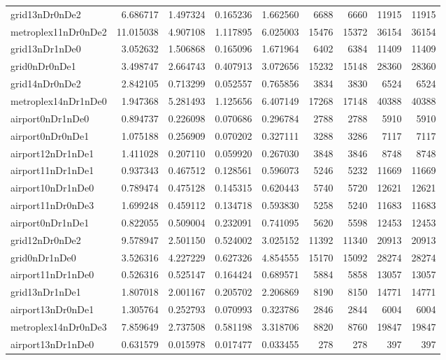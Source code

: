 \begin{longtable}{|l|r|r|r|r|r|r|r|r|}
grid13nDr0nDe2 & 6.686717 & 1.497324 & 0.165236 & 1.662560 & 6688 & 6660 & 11915 & 11915 \\
metroplex11nDr0nDe2 & 11.015038 & 4.907108 & 1.117895 & 6.025003 & 15476 & 15372 & 36154 & 36154 \\
grid13nDr1nDe0 & 3.052632 & 1.506868 & 0.165096 & 1.671964 & 6402 & 6384 & 11409 & 11409 \\
grid0nDr0nDe1 & 3.498747 & 2.664743 & 0.407913 & 3.072656 & 15232 & 15148 & 28360 & 28360 \\
grid14nDr0nDe2 & 2.842105 & 0.713299 & 0.052557 & 0.765856 & 3834 & 3830 & 6524 & 6524 \\
metroplex14nDr1nDe0 & 1.947368 & 5.281493 & 1.125656 & 6.407149 & 17268 & 17148 & 40388 & 40388 \\
airport0nDr1nDe0 & 0.894737 & 0.226098 & 0.070686 & 0.296784 & 2788 & 2788 & 5910 & 5910 \\
airport0nDr0nDe1 & 1.075188 & 0.256909 & 0.070202 & 0.327111 & 3288 & 3286 & 7117 & 7117 \\
airport12nDr1nDe1 & 1.411028 & 0.207110 & 0.059920 & 0.267030 & 3848 & 3846 & 8748 & 8748 \\
airport11nDr1nDe1 & 0.937343 & 0.467512 & 0.128561 & 0.596073 & 5246 & 5232 & 11669 & 11669 \\
airport10nDr1nDe0 & 0.789474 & 0.475128 & 0.145315 & 0.620443 & 5740 & 5720 & 12621 & 12621 \\
airport11nDr0nDe3 & 1.699248 & 0.459112 & 0.134718 & 0.593830 & 5258 & 5240 & 11683 & 11683 \\
airport0nDr1nDe1 & 0.822055 & 0.509004 & 0.232091 & 0.741095 & 5620 & 5598 & 12453 & 12453 \\
grid12nDr0nDe2 & 9.578947 & 2.501150 & 0.524002 & 3.025152 & 11392 & 11340 & 20913 & 20913 \\
grid0nDr1nDe0 & 3.526316 & 4.227229 & 0.627326 & 4.854555 & 15170 & 15092 & 28274 & 28274 \\
airport11nDr1nDe0 & 0.526316 & 0.525147 & 0.164424 & 0.689571 & 5884 & 5858 & 13057 & 13057 \\
grid13nDr1nDe1 & 1.807018 & 2.001167 & 0.205702 & 2.206869 & 8190 & 8150 & 14771 & 14771 \\
airport13nDr0nDe1 & 1.305764 & 0.252793 & 0.070993 & 0.323786 & 2846 & 2844 & 6004 & 6004 \\
metroplex14nDr0nDe3 & 7.859649 & 2.737508 & 0.581198 & 3.318706 & 8820 & 8760 & 19847 & 19847 \\
airport13nDr1nDe0 & 0.631579 & 0.015978 & 0.017477 & 0.033455 & 278 & 278 & 397 & 397 \\

\end{longtable}
